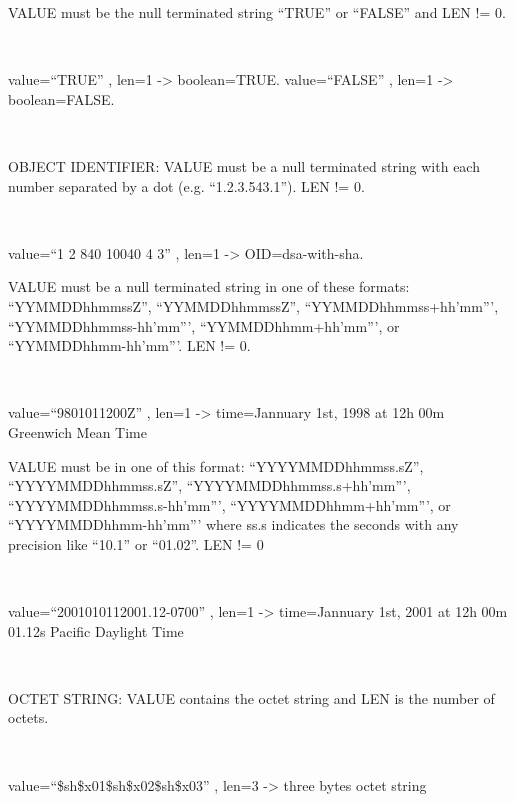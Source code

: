 \documentclass[]{article}
\begin{document}
VALUE must be the null terminated string ``TRUE'' or ``FALSE'' and LEN
!= 0.

~

value=``TRUE'' , len=1 -\textgreater{} boolean=TRUE. value=``FALSE'' ,
len=1 -\textgreater{} boolean=FALSE.

~

OBJECT IDENTIFIER: VALUE must be a null terminated string with each
number separated by a dot (e.g. ``1.2.3.543.1''). LEN != 0.

~

value=``1 2 840 10040 4 3'' , len=1 -\textgreater{} OID=dsa-with-sha.


VALUE must be a null terminated string in one of these formats:
``YYMMDDhhmmssZ'', ``YYMMDDhhmmssZ'', ``YYMMDDhhmmss+hh'mm''',
``YYMMDDhhmmss-hh'mm''', ``YYMMDDhhmm+hh'mm''', or
``YYMMDDhhmm-hh'mm'''. LEN != 0.

~

value=``9801011200Z'' , len=1 -\textgreater{} time=Jannuary 1st, 1998 at
12h 00m Greenwich Mean Time


VALUE must be in one of this format: ``YYYYMMDDhhmmss.sZ'',
``YYYYMMDDhhmmss.sZ'', ``YYYYMMDDhhmmss.s+hh'mm''',
``YYYYMMDDhhmmss.s-hh'mm''', ``YYYYMMDDhhmm+hh'mm''', or
``YYYYMMDDhhmm-hh'mm''' where ss.s indicates the seconds with any
precision like ``10.1'' or ``01.02''. LEN != 0

~

value=``2001010112001.12-0700'' , len=1 -\textgreater{} time=Jannuary
1st, 2001 at 12h 00m 01.12s Pacific Daylight Time

~

OCTET STRING: VALUE contains the octet string and LEN is the number of
octets.

~

value=``\$sh\$x01\$sh\$x02\$sh\$x03'' , len=3 -\textgreater{} three
bytes octet string

\end{document}

